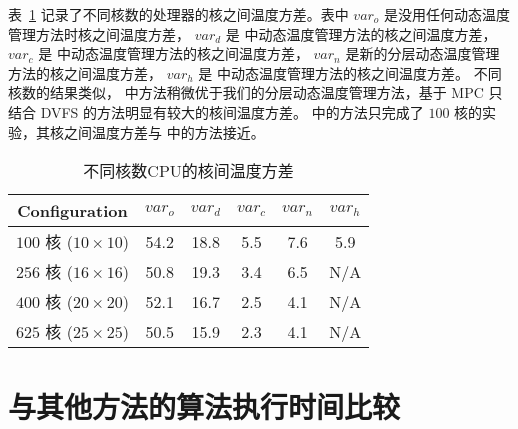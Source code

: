 表~\ref{tab:var} 记录了不同核数的处理器的核之间温度方差。表中 $var_o$ 是没用任何动态温度管理方法时核之间温度方差，
$var_d$ 是 \cite{Zanini:ECCTD'09} 中动态温度管理方法的核之间温度方差，
$var_c$ 是 \cite{MaWang:APCCAS'14} 中动态温度管理方法的核之间温度方差，
$var_n$ 是新的分层动态温度管理方法的核之间温度方差，
$var_h$ 是 \cite{Hanumaiah:TCAD'11} 中动态温度管理方法的核之间温度方差。
不同核数的结果类似， \cite{MaWang:APCCAS'14} 中方法稍微优于我们的分层动态温度管理方法，基于 MPC 只结合 DVFS 的方法明显有较大的核间温度方差。
\cite{Hanumaiah:TCAD'11} 中的方法只完成了 $100$ 核的实验，其核之间温度方差与 \cite{MaWang:APCCAS'14} 中的方法接近。\\
\begin{table}[H]
\centering
 \caption{不同核数CPU的核间温度方差 \label{tab:var}}{
 \begin{tabular}{|c|c|c|c|c|c|}
 \hline
 \hline
 Configuration  & $var_o$ & $var_d$ & $var_c$ & $var_n$ & $var_h$ \\
 \hline 
 \hline
 $100$ 核 ($10 \times 10$) & 54.2 & 18.8 & 5.5 & 7.6 & 5.9\\

 \hline
 $256$ 核 ($16 \times 16$) & 50.8 & 19.3 & 3.4 & 6.5 & N/A\\
 \hline
 $400$ 核 ($20 \times 20$) & 52.1 & 16.7 & 2.5 & 4.1 & N/A\\
 \hline
 $625$ 核 ($25 \times 25$) & 50.5 & 15.9 & 2.3 & 4.1 & N/A\\
 \hline
 \hline
 \end{tabular}}
 \end{table}
 
 \section{与其他方法的算法执行时间比较}\label{sec:time_comp}
 
